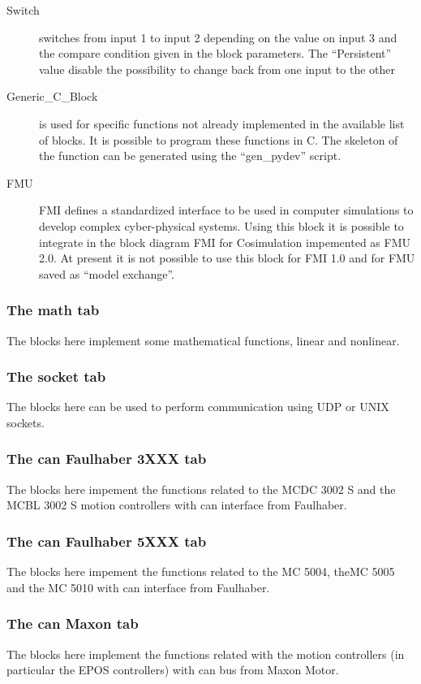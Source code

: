 \begin{description}
\item[Switch] switches from input 1 to input 2 depending on the value on input 3 and the compare condition given in the block parameters. The ``Persistent'' value disable the possibility to change back from one input to the other
\item[Generic\_C\_Block] is used for specific functions not already implemented in the available list of blocks. It is possible to program these functions in C. The skeleton of the function can be generated using the ``gen\_pydev'' script.
\item[FMU] FMI defines a standardized interface to be used in computer simulations to develop complex cyber-physical systems. Using this block it is possible to integrate in the block diagram FMI for Cosimulation impemented as FMU 2.0. At present it is not possible to use this block for FMI 1.0 and for FMU saved as ``model exchange''.
\end{description}

\subsubsection{The math tab}
The blocks here implement some mathematical functions, linear and nonlinear.

\subsubsection{The socket tab}
The blocks here can be used to perform communication using UDP or UNIX sockets.

\subsubsection{The can Faulhaber 3XXX tab}
The blocks here impement the functions related to the MCDC 3002 S and the MCBL 3002 S motion controllers with can interface from Faulhaber.

\subsubsection{The can Faulhaber 5XXX tab}
The blocks here impement the functions related to the MC 5004, theMC 5005 and the MC 5010 with can interface from Faulhaber.

\subsubsection{The can Maxon tab}
The blocks here implement the functions related with the motion controllers (in particular the EPOS controllers) with can bus from Maxon Motor.

